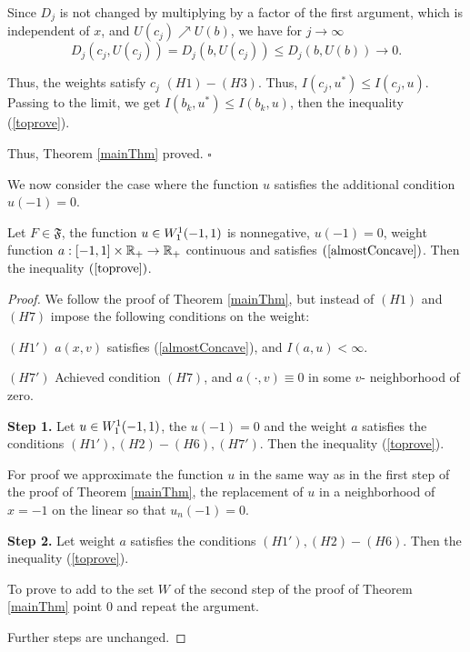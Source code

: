 Since $D_j$ is not changed by multiplying by a factor of the first argument, which is independent of $x$,
and $U(c_j) \nearrow U(b)$, we have for $j \to \infty$
$$D_j(c_j, U(c_j)) = D_j(b, U(c_j)) \le D_j(b, U(b)) \to 0.$$

Thus, the weights satisfy $c_j$ $(H1)-(H3)$.
Thus, $I(c_j, u^*) \le I(c_j, u)$.
Passing to the limit, we get $I(b_k, u^*) \le I(b_k, u)$, then the inequality (\ref{toprove}).

Thus, Theorem \ref{mainThm} proved.
\hfill $\square$

\medskip

We now consider the case where the function $u$ satisfies the additional condition $u(-1) = 0$.
\begin{thm}
Let $F \in \mathfrak{F}$, the function $u \in W_1^1(-1, 1)$ is nonnegative, $u(-1) = 0$,
weight function $a: [-1, 1] \times \mathbb R_+ \to \mathbb R_+$ continuous
and satisfies $(\ref{almostConcave})$.
Then the inequality $(\ref{toprove})$.
\end{thm}

\begin{proof}
We follow the proof of Theorem \ref{mainThm},
but instead of $(H1)$ and $(H7)$ impose the following conditions on the weight:

\bigskip
\noindent
$(H1')$ $a(x, v)$ satisfies (\ref{almostConcave}), and $I(a, u) < \infty$.

\bigskip
\noindent
$(H7')$ Achieved condition $(H7)$, and $a(\cdot, v) \equiv 0$ in some $v$- neighborhood of zero.

\bigskip
{\bf Step 1.} Let $u \in W_1^1(-1, 1)$, the $u(-1) = 0$ and the weight $a$ satisfies the conditions $(H1'), (H2)-(H6), (H7')$.
Then the inequality (\ref{toprove}).

For proof we approximate the function $u$ in the same way as in the first step of the proof of Theorem \ref{mainThm},
the replacement of $u$ in a neighborhood of $x = -1$ on the linear so that $u_n(-1) = 0$.

\bigskip
{\bf Step 2.} Let weight $a$ satisfies the conditions $(H1'), (H2)-(H6)$.
Then the inequality (\ref{toprove}).

To prove to add to the set $W$ of the second step of the proof of Theorem \ref{mainThm} point $0$
and repeat the argument.

\medskip

Further steps are unchanged.
\end{proof}

